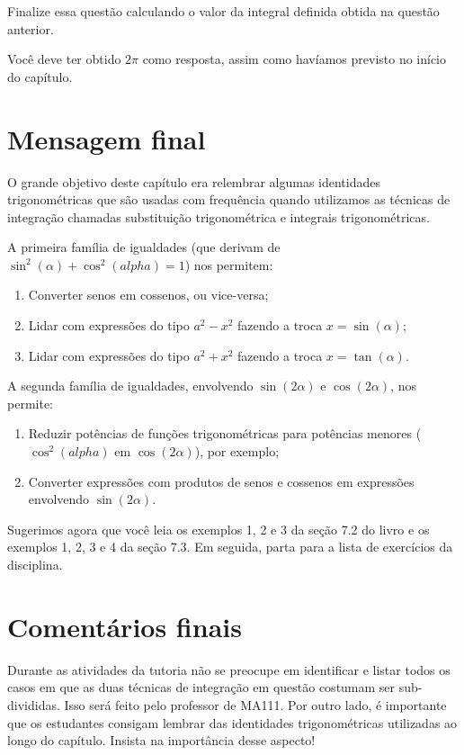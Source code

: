 \documentclass[main_estudante.tex]{subfiles}
\begin{document}
\begin{questao}
Finalize essa questão calculando o valor da integral definida obtida na questão anterior.
\end{questao}

Você deve ter obtido $2\pi$ como resposta, assim como havíamos previsto no início do capítulo.

\section{Mensagem final}

O grande objetivo deste capítulo era relembrar algumas identidades trigonométricas que são usadas com frequência quando utilizamos as técnicas de integração chamadas substituição trigonométrica e integrais trigonométricas.

A primeira família de igualdades (que derivam de $\sin^2(\alpha)+\cos^2(alpha)=1$) nos permitem:
\begin{enumerate}[1)]
\item Converter senos em cossenos, ou vice-versa;
\item Lidar com expressões do tipo $a^2-x^2$ fazendo a troca $x=\sin(\alpha)$;
\item Lidar com expressões do tipo $a^2+x^2$ fazendo a troca $x=\tan(\alpha)$.
\end{enumerate}

A segunda família de igualdades, envolvendo $\sin(2\alpha)$ e $\cos(2\alpha)$, nos permite:
\begin{enumerate}[1)]
\item Reduzir potências de funções trigonométricas para potências menores ($\cos^2(alpha)$ em $\cos(2\alpha)$), por exemplo;
\item Converter expressões com produtos de senos e cossenos em expressões envolvendo $\sin(2\alpha)$.
\end{enumerate}

Sugerimos agora que você leia os exemplos 1, 2 e 3 da seção 7.2 do livro  e os exemplos 1, 2, 3 e 4 da seção 7.3. Em seguida, parta para a lista de exercícios da disciplina.

\paraTutores

\section{Comentários finais}

Durante as atividades da tutoria não se preocupe em identificar e listar todos os casos em que as duas técnicas de integração em questão costumam ser sub-divididas. Isso será feito pelo professor de MA111. Por outro lado, é importante que os estudantes consigam lembrar das identidades trigonométricas utilizadas ao longo do capítulo. Insista na importância desse aspecto!
\end{document}
